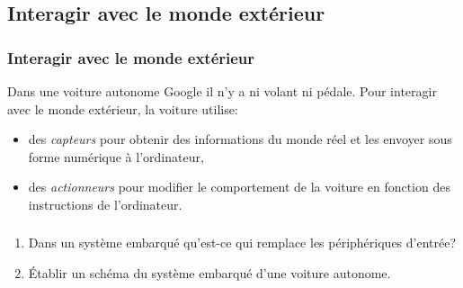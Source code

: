 \documentclass[svgnames,11pt]{beamer}
\begin{document}
\subsection{Interagir avec le monde extérieur}
\begin{frame}
    \frametitle{Interagir avec le monde extérieur}

    Dans une voiture autonome Google il n'y a ni volant ni pédale. Pour interagir avec le monde extérieur, la voiture utilise:
    \begin{itemize}
        \item<1-> des \emph{capteurs} pour obtenir des informations du monde réel et les envoyer sous forme numérique à l'ordinateur,
        \item<2-> des \emph{actionneurs} pour modifier le comportement de la voiture en fonction des instructions de l'ordinateur.
    \end{itemize}

\end{frame}
\begin{frame}
    \frametitle{}

    \begin{center}
        \label{sie}
    \end{center}

\end{frame}
\begin{frame}
    \frametitle{}

    \begin{activite}
        \begin{enumerate}
            \item Dans un système embarqué qu'est-ce qui remplace les périphériques d'entrée?
            \item Établir un schéma du système embarqué d'une voiture autonome.
        \end{enumerate}
    \end{activite}

\end{frame}
\end{document}
